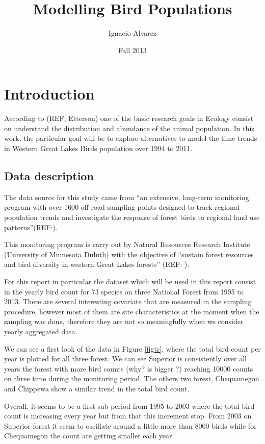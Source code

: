 \documentclass{article}
\title{ Modelling Bird Populations }
\author{Ignacio Alvarez}
\date{ Fall 2013 }
\begin{document}
\maketitle 

\vspace{3cm}

\section{Introduction} 
According to (REF, Etterson) one of the basic research goals in Ecology consist on understand the distribution and abundance of the animal population. In this work, the particular goal will be to explore alternatives to model the time trends in Western Great Lakes Birds population over 1994 to 2011. 

\subsection{Data description}

The data source for this study came from ``an extensive, long-term monitoring program with over 1600 off-road sampling points designed to track regional population trends and investigate the response of forest birds to regional land use patterns''(REF:). 

This monitoring program is carry out by Natural Resources Research Institute (University of Minnesota Duluth) with the objective of ``sustain forest resources and bird diversity in western Great Lakes forests'' (REF: ). 

For this report in particular the dataset which will be used in this report consist in the yearly bird count for 73 species on three National Forest from 1995 to 2013. There are several interesting covariate that are measured in the sampling procedure, however most of them are site characteristics at the moment when the sampling was done, therefore they are not so meaningfully when we consider yearly aggregated data.  

We can see a first look of the data in Figure \ref{figtr}, where the total bird count per year is plotted for all three forest. We can see Superior is consistently over all years the forest with more bird counts (why? is bigger ?) reaching 10000 counts on three time during the monitoring period. The others two forest, Chequamegon and Chippewa show a similar trend in the total bird count. 

Overall, it seems to be a first sub-period from 1995 to 2003 where the total bird count is increasing every year but from that this increment stop. From 2003 on Superior forest it seem to oscillate around a little more than 8000 birds while for Chequamegon the count are getting smaller each year. 
\end{document}
